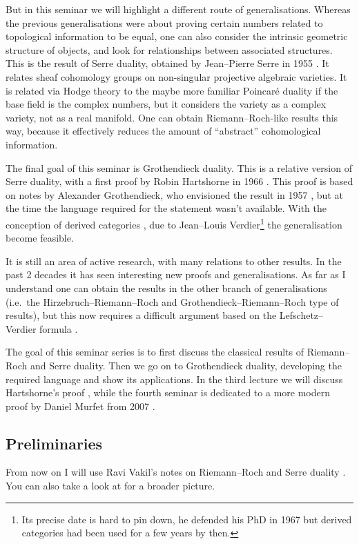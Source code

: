 \documentclass[10pt,a4paper]{article}
\theoremstyle{lecture}
\begin{document}
But in this seminar we will highlight a different route of generalisations. Whereas the previous generalisations were about proving certain numbers related to topological information to be equal, one can also consider the intrinsic geometric structure of objects, and look for relationships between associated structures. This is the result of Serre duality, obtained by Jean--Pierre Serre in 1955 \cite{serre-faisceaux-algebriques-coherents}. It relates sheaf cohomology groups on non-singular projective algebraic varieties. It is related via Hodge theory to the maybe more familiar Poincar\'e duality if the base field is the complex numbers, but it considers the variety as a complex variety, not as a real manifold. One can obtain Riemann--Roch-like results this way, because it effectively reduces the amount of ``abstract'' cohomological information.

The final goal of this seminar is Grothendieck duality. This is a relative version of Serre duality, with a first proof by Robin Hartshorne in 1966 \cite{hartshorne-residues-and-duality}. This proof is based on notes by Alexander Grothendieck, who envisioned the result in 1957 \cite{grothendieck-theoremes-de-dualite}, but at the time the language required for the statement wasn't available. With the conception of derived categories \cite{verdier-phd}, due to Jean--Louis Verdier\footnote{Its precise date is hard to pin down, he defended his PhD in 1967 but derived categories had been used for a few years by then.} the generalisation become feasible.

It is still an area of active research, with many relations to other results. In the past 2 decades it has seen interesting new proofs and generalisations. As far as I understand one can obtain the results in the other branch of generalisations (i.e.\ the Hirzebruch--Riemann--Roch and Grothendieck--Riemann--Roch type of results), but this now requires a difficult argument based on the Lefschetz--Verdier formula \cite[expos\'e III]{sga5}.

The goal of this seminar series is to first discuss the classical results of Riemann--Roch and Serre duality. Then we go on to Grothendieck duality, developing the required language and show its applications. In the third lecture we will discuss Hartshorne's proof \cite{hartshorne-residues-and-duality}, while the fourth seminar is dedicated to a more modern proof by Daniel Murfet from 2007 \cite{murfet-phd}.


\subsection{Preliminaries}
\label{subsection:preliminaries}
From now on I will use Ravi Vakil's notes on Riemann--Roch and Serre duality \cite{vakil-proof-riemann-roch}. You can also take a look at \cite{vakil-math216} for a broader picture.
\end{document}
